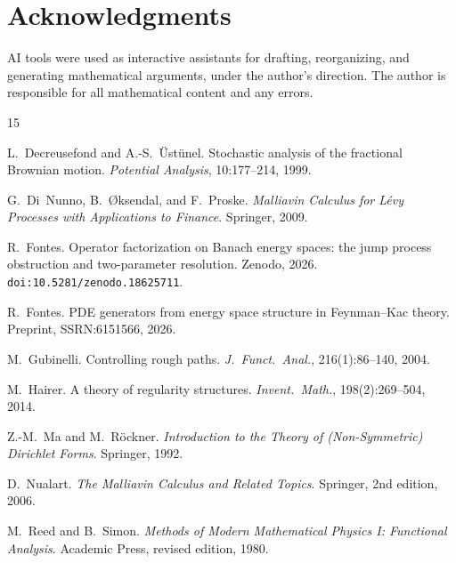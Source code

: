 \documentclass[11pt,a4paper]{article}
\theoremstyle{plain}
\theoremstyle{definition}
\theoremstyle{remark}
\begin{document}
\section*{Acknowledgments}

AI tools were used as interactive assistants for drafting, reorganizing, and generating mathematical arguments, under the author's direction. The author is responsible for all mathematical content and any errors.


\begin{thebibliography}{15}

L.~Decreusefond and A.-S.~\"Ust\"unel.
\newblock Stochastic analysis of the fractional Brownian motion.
\newblock \emph{Potential Analysis}, 10:177--214, 1999.

G.~Di~Nunno, B.~{\O}ksendal, and F.~Proske.
\newblock \emph{Malliavin Calculus for L\'evy Processes with Applications to Finance}.
\newblock Springer, 2009.

R.~Fontes.
\newblock Operator factorization on Banach energy spaces: the jump process obstruction and two-parameter resolution.
\newblock Zenodo, 2026. \texttt{doi:10.5281/zenodo.18625711}.

R.~Fontes.
\newblock PDE generators from energy space structure in Feynman--Kac theory.
\newblock Preprint, SSRN:6151566, 2026.

M.~Gubinelli.
\newblock Controlling rough paths.
\newblock \emph{J.\ Funct.\ Anal.}, 216(1):86--140, 2004.

M.~Hairer.
\newblock A theory of regularity structures.
\newblock \emph{Invent.\ Math.}, 198(2):269--504, 2014.

Z.-M.~Ma and M.~R\"ockner.
\newblock \emph{Introduction to the Theory of (Non-Symmetric) Dirichlet Forms}.
\newblock Springer, 1992.

D.~Nualart.
\newblock \emph{The Malliavin Calculus and Related Topics}.
\newblock Springer, 2nd edition, 2006.

M.~Reed and B.~Simon.
\newblock \emph{Methods of Modern Mathematical Physics I: Functional Analysis}.
\newblock Academic Press, revised edition, 1980.


\end{thebibliography}
\end{document}
